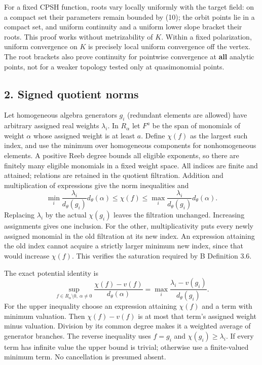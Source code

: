 \documentclass[
  10pt,
]{article}
\begin{document}
For a fixed CPSH function, roots vary locally uniformly with the target
field: on a compact set their parameters remain bounded by (10); the
orbit points lie in a compact set, and uniform continuity and a uniform
lower slope bracket their roots. This proof works without metrizability
of \(K\). Within a fixed polarization, uniform convergence on \(K\) is
precisely local uniform convergence off the vertex. The root brackets
also prove continuity for pointwise convergence at \textbf{all} analytic
points, not for a weaker topology tested only at quasimonomial points.

\subsection{2. Signed quotient norms}\label{signed-quotient-norms}

Let homogeneous algebra generators \(g_i\) (redundant elements are
allowed) have arbitrary assigned real weights \(\lambda_i\). In
\(R_\alpha\) let \(F^a\) be the span of monomials of weight \(\alpha\)
whose assigned weight is at least \(a\). Define \(\chi(f)\) as the
largest such index, and use the minimum over homogeneous components for
nonhomogeneous elements. A positive Reeb degree bounds all eligible
exponents, so there are finitely many eligible monomials in a fixed
weight space. All indices are finite and attained; relations are
retained in the quotient filtration. Addition and multiplication of
expressions give the norm inequalities and \[
 \min_i\frac{\lambda_i}{d_\theta(g_i)}d_\theta(\alpha)
 \leq\chi(f)\leq\max_i\frac{\lambda_i}{d_\theta(g_i)}d_\theta(\alpha).                            \tag{14}
\] Replacing \(\lambda_i\) by the actual \(\chi(g_i)\) leaves the
filtration unchanged. Increasing assignments gives one inclusion. For
the other, multiplicativity puts every newly assigned monomial in the
old filtration at its new index. An expression attaining the old index
cannot acquire a strictly larger minimum new index, since that would
increase \(\chi(f)\). This verifies the saturation required by B
Definition 3.6.

The exact potential identity is
\[ \sup_{f\in R_\alpha\setminus0,\ \alpha\ne0}\frac{\chi(f)-v(f)}{d_\theta(\alpha)}
       =\max_i\frac{\lambda_i-v(g_i)}{d_\theta(g_i)}.                                        \tag{15}\]
For the upper inequality choose an expression attaining \(\chi(f)\) and
a term with minimum valuation. Then \(\chi(f)-v(f)\) is at most that
term's assigned weight minus valuation. Division by its common degree
makes it a weighted average of generator branches. The reverse
inequality uses \(f=g_i\) and \(\chi(g_i)\geq\lambda_i\). If every term
has infinite value the upper bound is trivial; otherwise use a
finite-valued minimum term. No cancellation is presumed absent.
\end{document}
